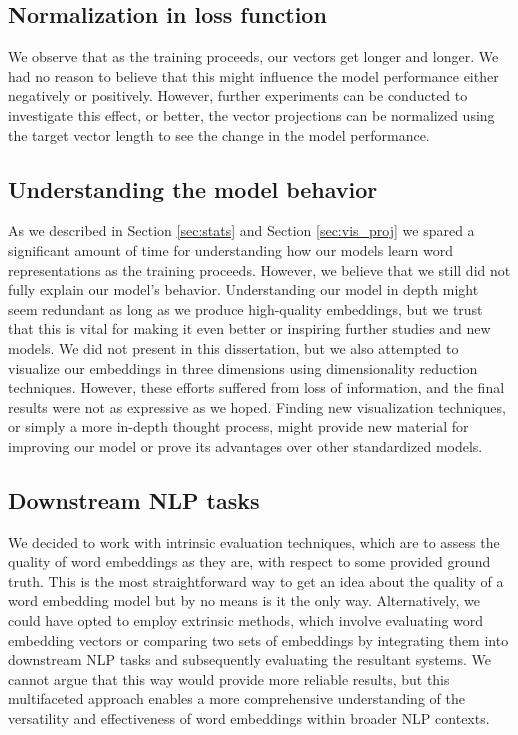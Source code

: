 \subsection{Normalization in loss function}
We observe that as the training proceeds, our vectors get longer and longer. We had no reason to believe that this might influence the model performance either negatively or positively. However, further experiments can be conducted to investigate this effect, or better, the vector projections can be normalized using the target vector length to see the change in the model performance.

\subsection{Understanding the model behavior}

As we described in Section \ref{sec:stats} and Section \ref{sec:vis_proj} we spared a significant amount of time for understanding how our models learn word representations as the training proceeds. However, we believe that we still did not fully explain our model's behavior. Understanding our model in depth might seem redundant as long as we produce high-quality embeddings, but we trust that this is vital for making it even better or inspiring further studies and new models. We did not present in this dissertation, but we also attempted to visualize our embeddings in three dimensions using dimensionality reduction techniques. However, these efforts suffered from loss of information, and the final results were not as expressive as we hoped. Finding new visualization techniques, or simply a more in-depth thought process, might provide new material for improving our model or prove its advantages over other standardized models.

\subsection{Downstream NLP tasks}
We decided to work with intrinsic evaluation techniques, which are to assess the quality of word embeddings as they are, with respect to some provided ground truth. This is the most straightforward way to get an idea about the quality of a word embedding model but by no means is it the only way. Alternatively, we could have opted to employ extrinsic methods, which involve evaluating word embedding vectors or comparing two sets of embeddings by integrating them into downstream \ac{NLP} tasks and subsequently evaluating the resultant systems. We cannot argue that this way would provide more reliable results, but this multifaceted approach enables a more comprehensive understanding of the versatility and effectiveness of word embeddings within broader \ac{NLP} contexts. 

